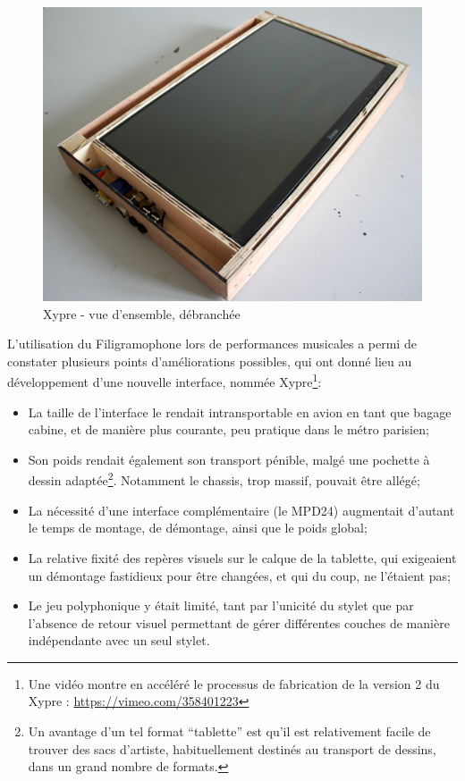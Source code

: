 \begin{figure}[!htbp]
\begin{minipage}[t]{0.6\textwidth}
	    \includegraphics[width=\linewidth]{gfx/05_interfaces/xypre_overview_unplugged.jpg}
		\caption{Xypre - vue d'ensemble, débranchée}
		\label{fig:interface:xypre}
	\end{minipage}
\end{figure}

\noindent L'utilisation du Filigramophone lors de performances musicales a permi de constater plusieurs points d'améliorations possibles, qui ont donné lieu au développement d'une nouvelle interface, nommée Xypre\footnote{Une vidéo montre en accéléré le processus de fabrication de la version 2 du Xypre : \url{https://vimeo.com/358401223}}:
\vspace{-1em}
\begin{itemize}[noitemsep]
	\item La taille de l'interface le rendait intransportable en avion en tant que bagage cabine, et de manière plus courante, peu pratique dans le métro parisien;
	\item Son poids rendait également son transport pénible, malgé une pochette à dessin adaptée\footnote{Un avantage d'un tel format ``tablette'' est qu'il est relativement facile de trouver des sacs d'artiste, habituellement destinés au transport de dessins, dans un grand nombre de formats.}. Notamment le chassis, trop massif, pouvait être allégé;
	\item La nécessité d'une interface complémentaire (le MPD24) augmentait d'autant le temps de montage, de démontage, ainsi que le poids global;
	\item La relative fixité des repères visuels sur le calque de la tablette, qui exigeaient un démontage fastidieux pour être changées, et qui du coup, ne l'étaient pas;
	\item Le jeu polyphonique y était limité, tant par l'unicité du stylet que par l'absence de retour visuel permettant de gérer différentes couches de manière indépendante avec un seul stylet.
\end{itemize}

